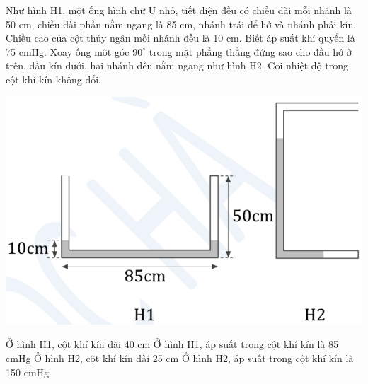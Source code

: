 \documentclass[12pt,a4paper]{article}
\begin{document}
\begin{ex}
	Như hình H1, một ống hình chữ U nhỏ, tiết diện đều có chiều dài mỗi nhánh là 50 cm, chiều dài phần nằm ngang là 85 cm, nhánh trái để hở và nhánh phải kín. Chiều cao của cột thủy ngân mỗi nhánh đều là 10 cm. Biết áp suất khí quyển là 75 cmHg. Xoay ống một góc $90^\circ$ trong mặt phẳng thẳng đứng sao cho đầu hở ở trên, đầu kín dưới, hai nhánh đều nằm ngang như hình H2. Coi nhiệt độ trong cột khí kín không đổi.
		\begin{center}
		\includegraphics[scale=0.4]{img/10.png}
	\end{center}
	\choiceTF
	{Ở hình H1, cột khí kín dài 40 cm}
	{Ở hình H1, áp suất trong cột khí kín là 85 cmHg}
	{Ở hình H2, cột khí kín dài 25 cm}
	{Ở hình H2, áp suất trong cột khí kín là 150 cmHg}
\end{ex}
\end{document}
